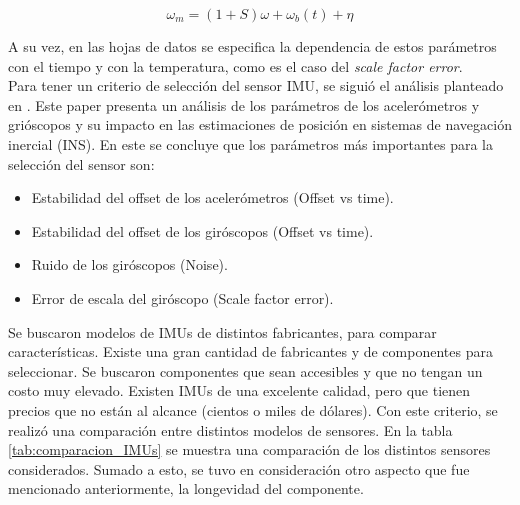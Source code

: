 \begin{equation}
    \omega_m = (1+S)\omega + \omega_b (t) + \eta
    \label{eq:medicion_vs_real}
\end{equation}

A su vez, en las hojas de datos se especifica la dependencia de estos parámetros con el tiempo y con la temperatura, como es el caso del \textit{scale factor error}.\\

Para tener un criterio de selección del sensor IMU, se siguió el análisis planteado en \cite{borodacz2022review}. Este paper presenta un análisis de los parámetros de los acelerómetros y grióscopos y su impacto en las estimaciones de posición en sistemas de navegación inercial (INS). En este se concluye que los parámetros más importantes para la selección del sensor son:

\begin{itemize}
    \item Estabilidad del offset de los acelerómetros (Offset vs time).
    \item Estabilidad del offset de los giróscopos (Offset vs time).
    \item Ruido de los giróscopos (Noise).
    \item Error de escala del giróscopo (Scale factor error).
\end{itemize}

Se buscaron modelos de IMUs de distintos fabricantes, para comparar características. Existe una gran cantidad de fabricantes y de componentes para seleccionar. Se buscaron componentes que sean accesibles y que no tengan un costo muy elevado. Existen IMUs de una excelente calidad, pero que tienen precios que no están al alcance (cientos o miles de dólares). Con este criterio, se realizó una comparación entre distintos modelos de sensores. En la tabla \ref{tab:comparacion_IMUs} se muestra una comparación de los distintos sensores considerados. Sumado a esto, se tuvo en consideración otro aspecto que fue mencionado anteriormente, la longevidad del componente.

